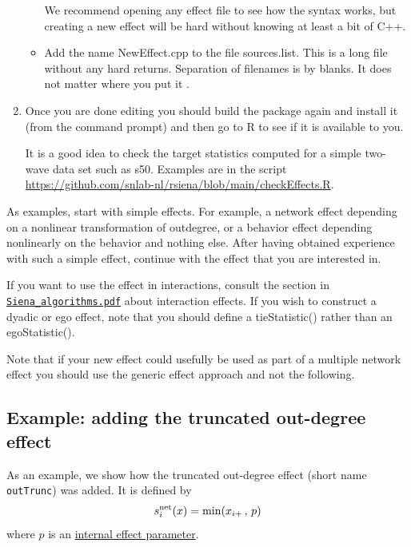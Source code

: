 \documentclass[a4paper,fleqn,11pt]{article}
\newcommand{\+}{\, + \,}
\newcommand{\sfn}[1]{\textsf{#1}}
\begin{document}
\begin{enumerate}
\begin{itemize}
                  We recommend opening any effect file to see
                  how the syntax works, but creating a new effect will be hard
                   without knowing at least a bit of C++.
            \item Add the name \textsf{NewEffect.cpp} to the file \textsf{sources.list}.
                  This is a long file without any hard returns.
                  Separation of filenames is by blanks.
                  It does not matter where you put it .
		\end{itemize}

		\item Once you are done editing you should build
the package again and install it (from the command prompt)
and then go to R to see if it is available to you.

It is a good idea to check the target statistics computed for a simple
two-wave data set such as \sfn{s50}.
Examples are in the script
\url{https://github.com/snlab-nl/rsiena/blob/main/checkEffects.R}.
\end{enumerate}

As examples, start with simple effects.
For example, a network effect depending on a nonlinear transformation
of outdegree, or a behavior effect depending nonlinearly
on the behavior and nothing else.
After having obtained experience with such a simple effect,
continue with the effect that you are interested in.
\medskip

If you want to use the effect in interactions, consult the section in
\href{http://www.stats.ox.ac.uk/~snijders/siena/Siena_algorithms.pdf}{\texttt{Siena\_algorithms.pdf}}
about interaction effects.
If you wish to construct a dyadic or ego effect, note that
you should define a \sfn{tieStatistic()}
rather than an \sfn{egoStatistic()}.
\medskip

Note that if your new effect could usefully be used as part of a multiple
network effect you should use the generic effect approach and not the following.


\subsection{Example: adding the truncated out-degree effect}

As an example, we show how the truncated out-degree effect
(short name \texttt{outTrunc}) was added. It is
 defined by
 \begin{equation}
  s^{\rm net}_{i}(x) = \text{min}(x_{i+}\,,\, p)   \label{outTrunc}
 \end{equation}
where $p$ is an \hyperlink{T_effpar}{internal effect parameter}.
\end{document}
